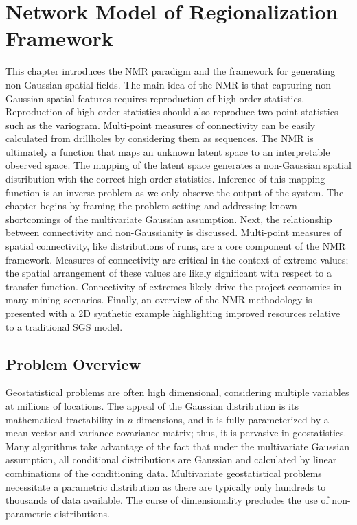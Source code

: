 
\chapter{Network Model of Regionalization Framework}
\label{ch:03framework}

This chapter introduces the \gls{NMR} paradigm and the framework for generating non-Gaussian spatial fields. The main idea of the \gls{NMR} is that capturing non-Gaussian spatial features requires reproduction of high-order statistics. Reproduction of high-order statistics should also reproduce two-point statistics such as the variogram. Multi-point measures of connectivity can be easily calculated from drillholes by considering them as sequences. The \gls{NMR} is ultimately a function that maps an unknown latent space to an interpretable observed space. The mapping of the latent space generates a non-Gaussian spatial distribution with the correct high-order statistics. Inference of this mapping function is an inverse problem as we only observe the output of the system. The chapter begins by framing the problem setting and addressing known shortcomings of the multivariate Gaussian assumption. Next, the relationship between connectivity and non-Gaussianity is discussed. Multi-point measures of spatial connectivity, like distributions of runs, are a core component of the \gls{NMR} framework. Measures of connectivity are critical in the context of extreme values; the spatial arrangement of these values are likely significant with respect to a transfer function. Connectivity of extremes likely drive the project economics in many mining scenarios. Finally, an overview of the \gls{NMR} methodology is presented with a \gls{2D} synthetic example highlighting improved resources relative to a traditional \gls{SGS} model.


\FloatBarrier
\section{Problem Overview}
\label{sec:03overview}

Geostatistical problems are often high dimensional, considering multiple variables at millions of locations. The appeal of the Gaussian distribution is its mathematical tractability in $n$-dimensions, and it is fully parameterized by a mean vector and variance-covariance matrix; thus, it is pervasive in geostatistics. Many algorithms take advantage of the fact that under the multivariate Gaussian assumption, all conditional distributions are Gaussian and calculated by linear combinations of the conditioning data. Multivariate geostatistical problems necessitate a parametric distribution as there are typically only hundreds to thousands of data available. The curse of dimensionality precludes the use of non-parametric distributions.

